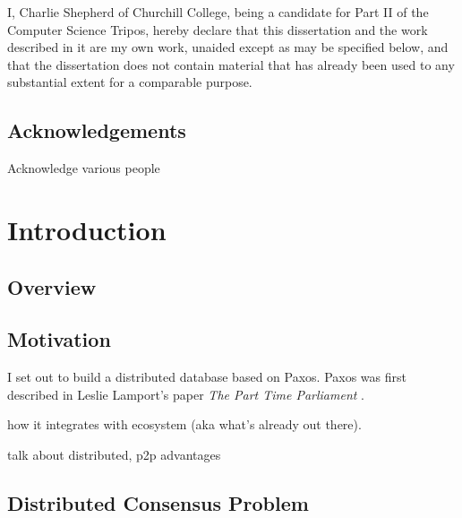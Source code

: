 \documentclass[12pt,twoside,notitlepage]{report}
\begin{document}
I, Charlie Shepherd of Churchill College, being a candidate for Part II of the Computer Science
Tripos, hereby declare that this dissertation and the work described in it are my own work,
unaided except as may be specified below, and that the dissertation does not contain material that
has already been used to any substantial extent for a comparable purpose.

\bigskip
{}

\medskip
{}

\cleardoublepage

\tableofcontents

\listoffigures

\newpage
\section*{Acknowledgements}

Acknowledge various people


\cleardoublepage        %

\setcounter{page}{1}
\pagestyle{headings}

\chapter{Introduction}

\section{Overview}

\section{Motivation}

I set out to build a distributed database based on Paxos. Paxos was first described in Leslie
Lamport's paper \emph{The Part Time Parliament} \cite{lamport98}.

how it integrates with ecosystem (aka what's already out there).


talk about distributed, p2p advantages


\section{Distributed Consensus Problem}
\end{document}
